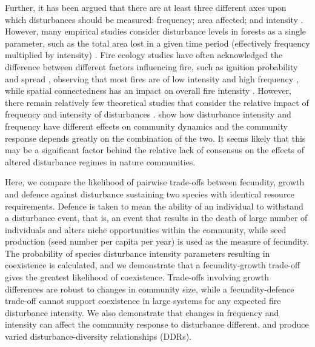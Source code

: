 \documentclass[a4paper]{article}
\begin{document}
Further, it has been argued that there are at least three different axes upon which disturbances should be measured: frequency; area affected; and intensity \citep{malanson1984intensity,miller1982community,sousa1984role}.  However, many empirical studies consider disturbance levels in forests as a single parameter, such as the total area lost in a given time period (effectively frequency multiplied by intensity) \citep[e.g.][]{molino2001tree,nakagawa2000impact,peterson1997tornado}. Fire ecology studies have often acknowledged the difference between different factors influencing fire, such as ignition probability and spread \citep[e.g.][]{kilgore1979fire,turner1994landscape}, observing that most fires are of low intensity and high frequency \citep{kilgore1979fire}, while spatial connectedness has an impact on overall fire intensity \citep{turner1994landscape}. However, there remain relatively few theoretical studies that consider the relative impact of frequency and intensity of disturbances \citep[but see ][]{miller2011frequency}. \cite{miller2011frequency} show how disturbance intensity and frequency have different effects on community dynamics and the community response depends greatly on the combination of the two. It seems likely that this may be a significant factor behind the relative lack of consensus on the effects of altered disturbance regimes in nature communities.


Here, we compare the likelihood of pairwise trade-offs between fecundity, growth and defence against disturbance sustaining two species with identical resource requirements. Defence is taken to mean the ability of an individual to withstand a disturbance event, that is, an event that results in the death of large number of individuals and alters niche opportunities within the community, while seed production (seed number per capita per year) is used as the measure of fecundity. The probability of species disturbance intensity parameters resulting in coexistence is calculated, and we demonstrate that a fecundity-growth trade-off gives the greatest likelihood of coexistence. Trade-offs involving growth differences are robust to changes in community size, while a fecundity-defence trade-off cannot support coexistence in large systems for any expected fire disturbance intensity. We also demonstrate that changes in frequency and intensity can affect the community response to disturbance different, and produce varied disturbance-diversity relationships (DDRs).
\end{document}
